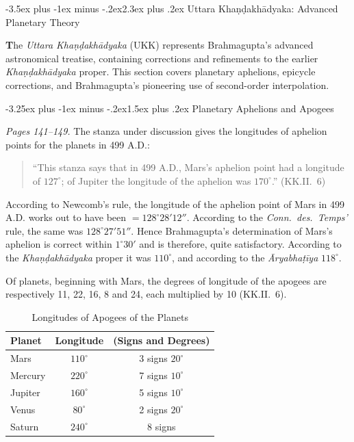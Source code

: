 \documentclass[11pt,a4paper]{article}
\makeatletter
\renewcommand{\section}{\@startsection {section}{1}{\z@}%
  {-3.5ex plus -1ex minus -.2ex}{2.3ex plus .2ex}%
  {\normalfont\Large\bfseries\color{sectioncolor}}}
\renewcommand{\subsection}{\@startsection{subsection}{2}{\z@}%
  {-3.25ex plus -1ex minus -.2ex}{1.5ex plus .2ex}%
  {\normalfont\large\bfseries\color{sectioncolor}}}
\newcommand{\cnote}[1]{\textcolor{notecolor}{\textit{#1}}}
\makeatother
\begin{document}
\section{Uttara Khaṇḍakhādyaka: Advanced Planetary Theory}

\textbf{T}he \textit{Uttara Khaṇḍakhādyaka} (UKK) represents Brahmagupta's advanced astronomical treatise, containing corrections and refinements to the earlier \textit{Khaṇḍakhādyaka} proper. This section covers planetary aphelions, epicycle corrections, and Brahmagupta's pioneering use of second-order interpolation.

\subsection{Planetary Aphelions and Apogees}

\cnote{Pages 141--149.} The stanza under discussion gives the longitudes of aphelion points for the planets in 499 A.D.:

\begin{quote}
``This stanza says that in 499 A.D., Mars's aphelion point had a longitude of $127^\circ$; of Jupiter the longitude of the aphelion was $170^\circ$.'' (KK.II.~6)
\end{quote}

According to Newcomb's rule, the longitude of the aphelion point of Mars in 499 A.D. works out to have been $= 128^\circ 28' 12''$. According to the \textit{Conn.\ des.\ Temps'} rule, the same was $128^\circ 27' 51''$. Hence Brahmagupta's determination of Mars's aphelion is correct within $1^\circ 30'$ and is therefore, quite satisfactory. According to the \textit{Khaṇḍakhādyaka} proper it was $110^\circ$, and according to the \textit{Āryabhaṭīya} $118^\circ$.

Of planets, beginning with Mars, the degrees of longitude of the apogees are respectively 11, 22, 16, 8 and 24, each multiplied by 10 (KK.II.~6).

\begin{table}[h]
\centering
\caption{Longitudes of Apogees of the Planets}
\begin{tabular}{@{}lcc@{}}
\toprule
\textbf{Planet} & \textbf{Longitude} & \textbf{(Signs and Degrees)} \\
\midrule
Mars & $110^\circ$ & 3 signs $20^\circ$ \\
Mercury & $220^\circ$ & 7 signs $10^\circ$ \\
Jupiter & $160^\circ$ & 5 signs $10^\circ$ \\
Venus & $80^\circ$ & 2 signs $20^\circ$ \\
Saturn & $240^\circ$ & 8 signs \\
\bottomrule
\end{tabular}
\end{table}
\end{document}
